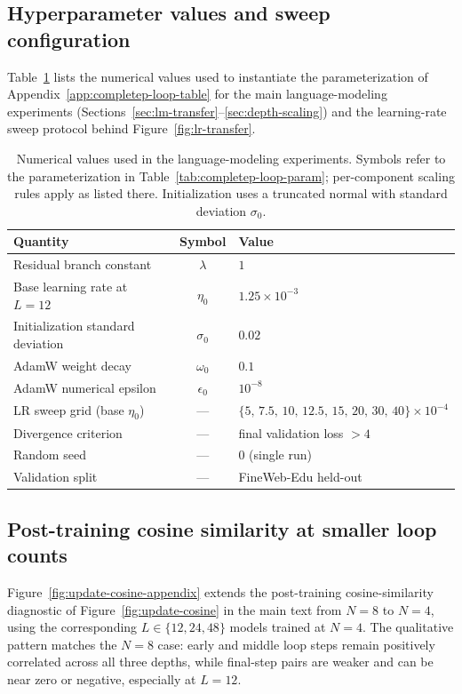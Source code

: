 \subsection{Hyperparameter values and sweep configuration}
\label{app:hparam-values}

Table~\ref{tab:repro} lists the numerical values used to instantiate the parameterization of Appendix~\ref{app:completep-loop-table} for the main language-modeling experiments (Sections~\ref{sec:lm-transfer}--\ref{sec:depth-scaling}) and the learning-rate sweep protocol behind Figure~\ref{fig:lr-transfer}.

\begin{table}[t]
\centering
\footnotesize
\setlength{\tabcolsep}{6pt}
\begin{tabular}{@{}lcl@{}}
\toprule
Quantity & Symbol & Value \\
\midrule
Residual branch constant & $\lambda$ & $1$ \\
Base learning rate at $L{=}12$ & $\eta_0$ & $1.25\times10^{-3}$ \\
Initialization standard deviation & $\sigma_0$ & $0.02$ \\
AdamW weight decay & $\omega_0$ & $0.1$ \\
AdamW numerical epsilon & $\epsilon_0$ & $10^{-8}$ \\
\midrule
LR sweep grid (base $\eta_0$) & --- & $\{5,\,7.5,\,10,\,12.5,\,15,\,20,\,30,\,40\}\!\times\!10^{-4}$ \\
Divergence criterion & --- & final validation loss $>4$ \\
Random seed & --- & $0$ (single run) \\
Validation split & --- & FineWeb-Edu held-out \\
\bottomrule
\end{tabular}
\caption{
Numerical values used in the language-modeling experiments. Symbols refer to the parameterization in Table~\ref{tab:completep-loop-param}; per-component scaling rules apply as listed there. Initialization uses a truncated normal with standard deviation $\sigma_0$.
}
\label{tab:repro}
\end{table}

\subsection{Post-training cosine similarity at smaller loop counts}
\label{app:cosine-small-N}

Figure~\ref{fig:update-cosine-appendix} extends the post-training cosine-similarity diagnostic of Figure~\ref{fig:update-cosine} in the main text from $N{=}8$ to $N{=}4$, using the corresponding $L\in\{12,24,48\}$ models trained at $N{=}4$.
The qualitative pattern matches the $N{=}8$ case: early and middle loop steps remain positively correlated across all three depths, while final-step pairs are weaker and can be near zero or negative, especially at $L{=}12$.

